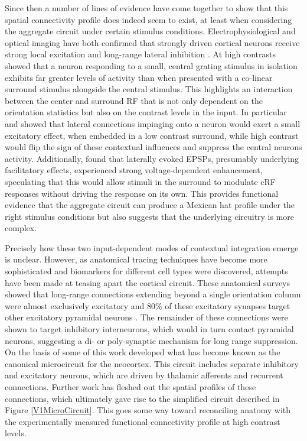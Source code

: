 Since then a number of lines of evidence have come together to show
that this spatial connectivity profile does indeed seem to exist, at
least when considering the aggregate circuit under certain stimulus
conditions. Electrophysiological and optical imaging have both
confirmed that strongly driven cortical neurons receive strong local
excitation and long-range lateral inhibition
\citep{Grinvald1994,Sceniak2001}. At high contrasts
\cite{Grinvald1994} showed that a neuron responding to a small,
central grating stimulus in isolation exhibits far greater levels of
activity than when presented with a co-linear surround stimulus
alongside the central stimulus. This highlights an interaction between
the center and surround RF that is not only dependent on the
orientation statistics but also on the contrast levels in the
input. In particular \cite{Hirsch1991} and \cite{Weliky1995} showed
that lateral connections impinging onto a neuron would exert a small
excitatory effect, when embedded in a low contrast surround, while
high contrast would flip the sign of these contextual influences and
suppress the central neurons activity. Additionally, \cite{Hirsch1991}
found that laterally evoked EPSPs, presumably underlying facilitatory
effects, experienced strong voltage-dependent enhancement, speculating
that this would allow stimuli in the surround to modulate cRF
responses without driving the response on its own. This provides
functional evidence that the aggregate circuit can produce a Mexican
hat profile under the right stimulus conditions but also suggests that
the underlying circuitry is more complex.

Precisely how these two input-dependent modes of contextual
integration emerge is unclear. However, as anatomical tracing
techniques have become more sophisticated and biomarkers for different
cell types were discovered, attempts have been made at teasing apart
the cortical circuit. These anatomical surveys showed that long-range
connections extending beyond a single orientation column were almost
exclusively excitatory and 80\% of these excitatory synapses target
other excitatory pyramidal neurons
\citep{Hirsch1991,Kisvarday1997a}. The remainder of these connections
were shown to target inhibitory interneurons, which would in turn
contact pyramidal neurons, suggesting a di- or poly-synaptic mechanism
for long range suppression. On the basis of some of this work
\cite{Douglas1991} developed what has become known as the canonical
microcircuit for the neocortex. This circuit includes separate
inhibitory and excitatory neurons, which are driven by thalamic
afferents and recurrent connections. Further work has fleshed out the
spatial profiles of these connections, which ultimately gave rise to
the simplified circuit described in Figure \ref{V1MicroCircuit}. This
goes some way toward reconciling anatomy with the experimentally
measured functional connectivity profile at high contrast levels.

